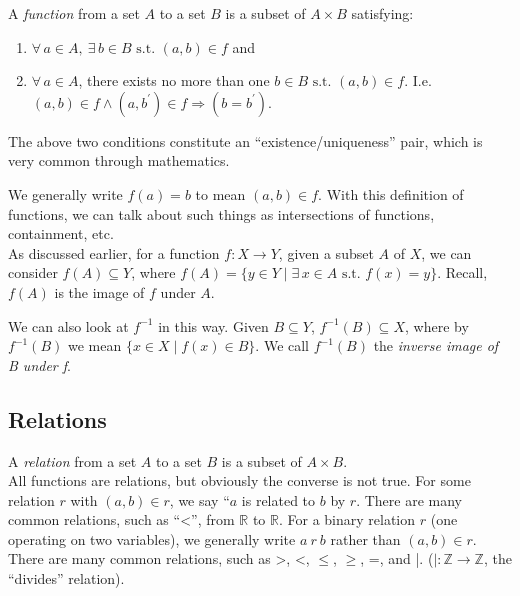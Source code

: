 \documentclass[12pt]{report}
\newcommand{\define}{  \noindent{\sc Definition }\hspace{5pt} }
\newcommand{\fall}{\forall\,}
\newcommand{\exst}{\exists\,}
\newcommand{\st}{\textrm{ s.t. }}
\newcommand{\reals}{\mathbb{R}}
\newcommand{\integers}{\mathbb{Z}}
\begin{document}
\define A  {\em function} from a set $A$ to a set $B$ is a
subset of $A \times B$ satisfying:
\begin{enumerate}
\item $\fall a \in A,\ \exst b \in B \st (a,b) \in f$ and
\item $\fall a \in A$, there exists no more than one $b \in B \st (a,b) \in
f$. I.e. $(a,b) \in f \land (a, b^\prime) \in f \Rightarrow (b = b^\prime)$.
\end{enumerate}

The above two conditions constitute an ``existence/uniqueness'' pair, which is
very common through mathematics.

We generally write $f(a) = b$ to mean $(a,b) \in f$. With this definition of
functions, we can talk about such things as intersections of functions,
containment, etc.\\

As discussed earlier, for a function $f:X\rightarrow Y$, given a subset 
$A$ of $X$, we can consider $f(A) \subseteq Y$, where 
$f(A) = \{y \in Y \mid \exst x \in A \st f(x) = y\}$. Recall, $f(A)$
is the image of $f$ under $A$.

We can also look at $f^{-1}$ in this way. Given $B \subseteq Y$, $f^{-1}(B)
\subseteq X$, where by $f^{-1}(B)$ we mean $\{x \in X \mid f(x) \in B\}$. We
call $f^{-1}(B)$ the  {\em inverse image of B under f}.\\

\subsection{Relations}

\define A  {\em relation} from a set $A$ to a set $B$ is a
subset of $A \times B$. \\

All functions are relations, but obviously the converse is not true. For some
relation $r$ with $(a,b) \in r$, we say ``$a$ is related to $b$ by $r$. There
are many common relations, such as ``<'', from $\reals$ to $\reals$. For a
binary relation $r$ (one operating on two variables), we generally write $a\
r\ b$ rather than $(a,b) \in r$. \\

There are many common relations, such as >, <, $\leq$, $\geq$, =, and |.
($|:\integers \rightarrow \integers$, the ``divides'' relation).\\
\end{document}
